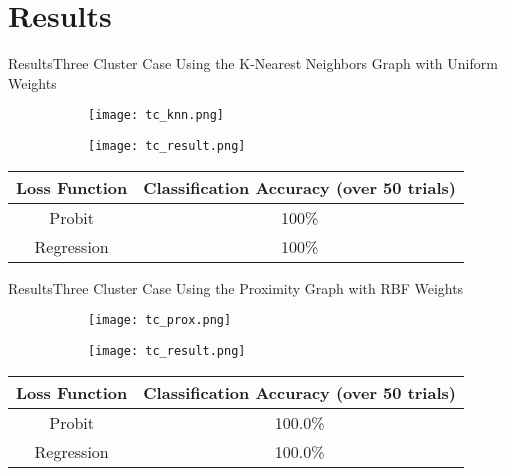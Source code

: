 \section{Results}

\begin{frame}{Results}{Three Cluster Case}
    Using the K-Nearest Neighbors Graph with Uniform Weights
    \begin{figure}[h!]
        \begin{subfigure}[b]{0.45\textwidth}
            \texttt{[image: tc\_knn.png]}
        \end{subfigure}
        \begin{subfigure}[b]{0.45\textwidth}
            \texttt{[image: tc\_result.png]}
        \end{subfigure}
    \end{figure}
    \begin{center}
        \begin{tabular}{|c|c|}
            \hline
            Loss Function & Classification Accuracy (over 50 trials) \\
            \hline
            Probit & 100\% \\
            Regression & 100\% \\
            \hline
        \end{tabular}
    \end{center}
\end{frame}

\begin{frame}{Results}{Three Cluster Case}
    Using the Proximity Graph with RBF Weights
    \begin{figure}[h!]
        \begin{subfigure}[b]{0.45\textwidth}
            \texttt{[image: tc\_prox.png]}
        \end{subfigure}
        \begin{subfigure}[b]{0.45\textwidth}
            \texttt{[image: tc\_result.png]}
        \end{subfigure}
    \end{figure}
    \begin{center}
        \begin{tabular}{|c|c|}
            \hline
            Loss Function & Classification Accuracy (over 50 trials) \\
            \hline
            Probit & 100.0\% \\
            Regression & 100.0\% \\
            \hline
        \end{tabular}
    \end{center}
\end{frame}

